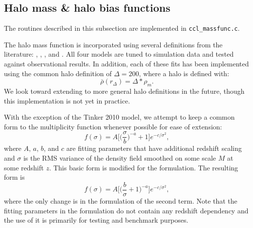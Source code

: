 \documentclass[\docopts]{\docclass}
\begin{document}
%
%
%


\subsection{Halo mass \& halo bias functions}
\label{sec:hmf}

The routines described in this subsection are implemented in {\tt ccl\_massfunc.c}.

The halo mass function is incorporated using several definitions from the literature: \citet{Tinker2008}, \citet{Tinker2010}, \citet{Angulo2012}, and \citet{Watson2013}. All four models are tuned to simulation data and tested against observational results. In addition, each of these fits has been implemented using the common halo definition of $\Delta = 200$, where a halo is defined with:
\begin{equation}
\bar{\rho}(r_{\Delta}) = \Delta*\rho_m.
\end{equation}
We look toward extending to more general halo definitions in the future, though this implementation is not yet in practice.


With the exception of the Tinker 2010 model, we attempt to keep a common form to the multiplicity function whenever possible for ease of extension:
\begin{equation}
f(\sigma)=A\Big[\Big(\frac{\sigma}{b}\Big)^{-a}+1\Big]e^{-c/{\sigma}^2},
\end{equation}
where $A$, $a$, $b$, and $c$ are fitting parameters that have additional redshift scaling and $\sigma$ is the RMS variance of the density field smoothed on some scale $M$ at some redshift $z$. This basic form is modified for the \citet{Angulo2012} formulation. The resulting form is
\begin{equation}
f(\sigma)=A\Big[\Big(\frac{b}{\sigma}+1\Big)^{-a}\Big]e^{-c/{\sigma}^2},
\end{equation}
where the only change is in the formulation of the second term. Note that the fitting parameters in the \citet{Angulo2012} formulation do not contain any redshift dependency and the use of it is primarily for testing and benchmark purposes.
\end{document}

